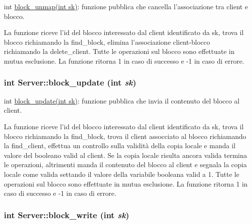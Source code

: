 int \hyperlink{classServer_da69667b5b906019f56db4d403412f89_da69667b5b906019f56db4d403412f89}{block\_\-unmap(int sk)}: funzione pubblica che cancella l'associazione tra client e blocco. 

La funzione riceve l'id del blocco interessato dal client identificato da sk, trova il blocco richiamando la find\_\-block, elimina l'associazione client-blocco richiamando la delete\_\-client. Tutte le operazioni sul blocco sono effettuate in mutua esclusione. La funzione ritorna 1 in caso di successo e -1 in caso di errore. \hypertarget{classServer_9207807bd61312d68333a6044855fe3f_9207807bd61312d68333a6044855fe3f}{
\subsubsection[{block\_\-update}]{\setlength{\rightskip}{0pt plus 5cm}int Server::block\_\-update (int {\em sk})}}
\label{classServer_9207807bd61312d68333a6044855fe3f_9207807bd61312d68333a6044855fe3f}


int \hyperlink{classServer_9207807bd61312d68333a6044855fe3f_9207807bd61312d68333a6044855fe3f}{block\_\-update(int sk)}: funzione pubblica che invia il contenuto del blocco al client. 

La funzione riceve l'id del blocco interessato dal client identificato da sk, trova il blocco richiamando la find\_\-block, trova il client assocciato al blocco richiamando la find\_\-client, effettua un controllo sulla validità della copia locale e manda il valore del booleano valid al client. Se la copia locale risulta ancora valida termina le operazioni, altrimenti manda il contenuto del blocco al client e segnala la copia locale come valida settando il valore della variabile booleana valid a 1. Tutte le operazioni sul blocco sono effettuate in mutua esclusione. La funzione ritorna 1 in caso di successo e -1 in caso di errore. \hypertarget{classServer_40865edc01694851c5bf2318bd4e4d21_40865edc01694851c5bf2318bd4e4d21}{
\subsubsection[{block\_\-write}]{\setlength{\rightskip}{0pt plus 5cm}int Server::block\_\-write (int {\em sk})}}
\label{classServer_40865edc01694851c5bf2318bd4e4d21_40865edc01694851c5bf2318bd4e4d21}



